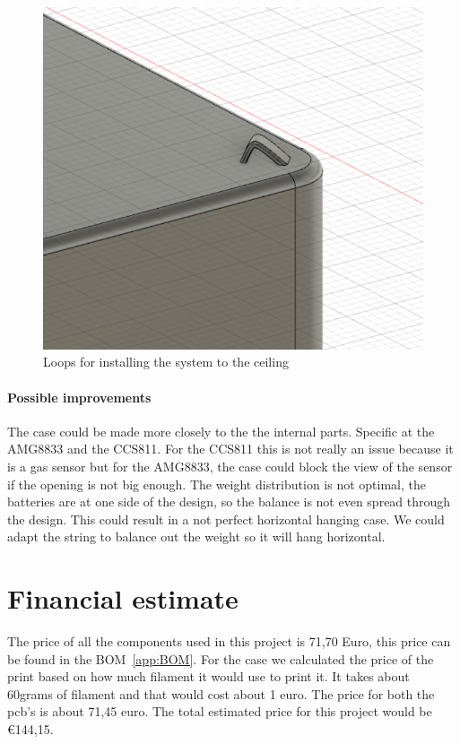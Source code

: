 \documentclass[11pt,a4paper]{article}
\begin{document}
\begin{figure}[H]
	\centering
	\includegraphics[width=1.0\linewidth]{loops_hang_system.png}
	\caption{Loops for installing the system to the ceiling}
	\label{fig:loops_hang_system}
\end{figure}
\paragraph{Possible improvements}
The case could be made more closely to the the internal parts. Specific at the AMG8833 and the CCS811. For the CCS811 this is not  really an issue because it is a gas sensor but for the AMG8833, the case could block the view of the sensor if the opening is not big enough. The weight distribution is not optimal, the batteries are at one side of the design, so the balance is not even spread through the design. This could result in a not perfect horizontal hanging case. We could adapt the string to balance out the weight so it will hang horizontal.


\section{Financial estimate}
The price of all the components used in this project is 71,70 Euro, this price can be found in the BOM~\ref{app:BOM}.
For the case we calculated the price of the print based on how much filament it would use to print it. It takes about 60grams of filament and that would cost about 1 euro.
The price for both the pcb's is about 71,45 euro. The total estimated price for this project would be \euro 144,15. 
\end{document}
